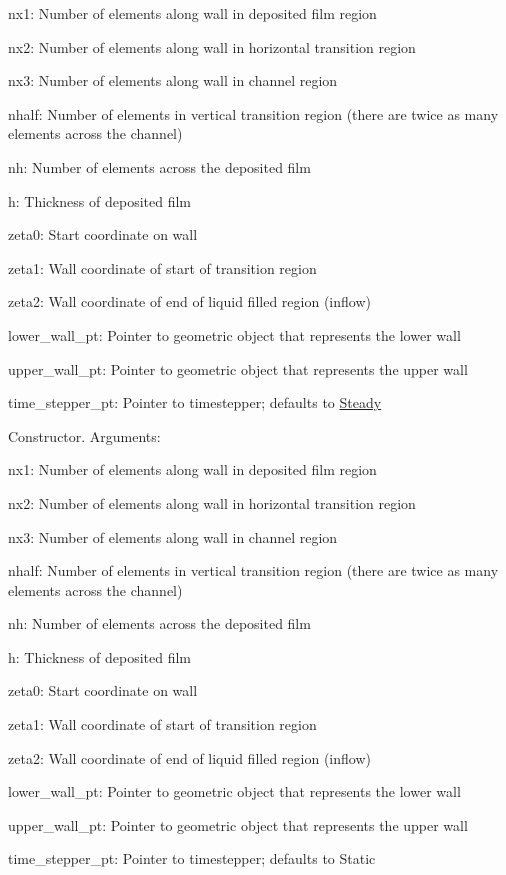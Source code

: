 \begin{DoxyItemize}
\item nx1\+: Number of elements along wall in deposited film region
\item nx2\+: Number of elements along wall in horizontal transition region
\item nx3\+: Number of elements along wall in channel region
\item nhalf\+: Number of elements in vertical transition region (there are twice as many elements across the channel)
\item nh\+: Number of elements across the deposited film
\item h\+: Thickness of deposited film
\item zeta0\+: Start coordinate on wall
\item zeta1\+: Wall coordinate of start of transition region
\item zeta2\+: Wall coordinate of end of liquid filled region (inflow)
\item lower\+\_\+wall\+\_\+pt\+: Pointer to geometric object that represents the lower wall
\item upper\+\_\+wall\+\_\+pt\+: Pointer to geometric object that represents the upper wall
\item time\+\_\+stepper\+\_\+pt\+: Pointer to timestepper; defaults to \hyperlink{classoomph_1_1Steady}{Steady}
\end{DoxyItemize}

Constructor. Arguments\+:
\begin{DoxyItemize}
\item nx1\+: Number of elements along wall in deposited film region
\item nx2\+: Number of elements along wall in horizontal transition region
\item nx3\+: Number of elements along wall in channel region
\item nhalf\+: Number of elements in vertical transition region (there are twice as many elements across the channel)
\item nh\+: Number of elements across the deposited film
\item h\+: Thickness of deposited film
\item zeta0\+: Start coordinate on wall
\item zeta1\+: Wall coordinate of start of transition region
\item zeta2\+: Wall coordinate of end of liquid filled region (inflow)
\item lower\+\_\+wall\+\_\+pt\+: Pointer to geometric object that represents the lower wall
\item upper\+\_\+wall\+\_\+pt\+: Pointer to geometric object that represents the upper wall
\item time\+\_\+stepper\+\_\+pt\+: Pointer to timestepper; defaults to Static 
\end{DoxyItemize}

